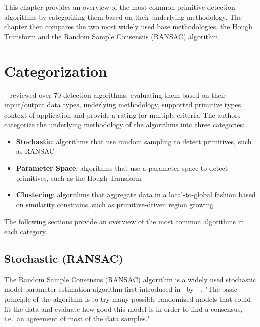 This chapter provides an overview of the most common primitive detection algorithms by categorizing them based on their underlying methodology.
The chapter then compares the two most widely used base methodologies,
the Hough Transform and the Random Sample Consensus (RANSAC) algorithm.


\section{Categorization}
\citeauthor{kaiser_survey_2019}~\cite{kaiser_survey_2019} reviewed over 70 detection algorithms, evaluating them based on their input/output data types,
underlying methodology, supported primitive types, context of application and provide a rating for multiple criteria.
The authors categorize the underlying methodology of the algorithms into three categories:
\begin{itemize}
    \item \textbf{Stochastic}: algorithms that use random sampling to detect primitives, such as RANSAC
    \item \textbf{Parameter Space}: algorithms that use a parameter space to detect primitives, such as the Hough Transform
    \item \textbf{Clustering}: algorithms that aggregate data in a local-to-global fashion based on similarity constrains, such as primitive-driven region growing
\end{itemize}

The following sections provide an overview of the most common algorithms in each category.

\subsection{Stochastic (RANSAC)}
The Random Sample Consensus (RANSAC) algorithm is a widely used stochastic model parameter estimation
algorithm first introduced in~\citeyear{fischler_random_1981}
by~\citeauthor{fischler_random_1981}~\cite{fischler_random_1981}.
"The basic principle of the algorithm is to try many possible randomized models that could fit
the data and evaluate how good this model is in order to find a consensus,
i.e.\ an agreement of most of the data samples."~\parencite{kaiser_survey_2019}

